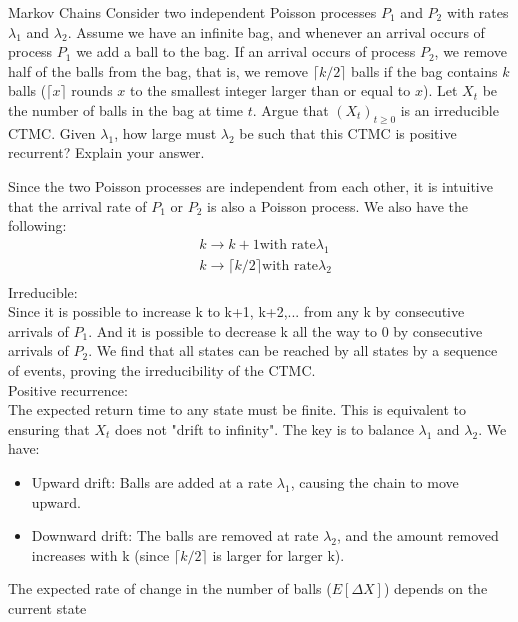 \begin{problem}{Markov Chains}
Consider two independent Poisson processes \( P_1 \) and \( P_2 \) with rates \( \lambda_1 \) and \( \lambda_2 \). Assume we have an infinite bag, and whenever an arrival occurs of process \( P_1 \) we add a ball to the bag. If an arrival occurs of process \( P_2 \), we remove half of the balls from the bag, that is, we remove \( \lceil k/2 \rceil \) balls if the bag contains \( k \) balls (\( \lceil x \rceil \) rounds \( x \) to the smallest integer larger than or equal to \( x \)). Let \( X_t \) be the number of balls in the bag at time \( t \). Argue that \( (X_t)_{t \geq 0} \) is an irreducible CTMC. Given \( \lambda_1 \), how large must \( \lambda_2 \) be such that this CTMC is positive recurrent? Explain your answer.
\end{problem}
\begin{solution}
    Since the two Poisson processes are independent from each other, it is intuitive that the arrival rate of $P_1$ or $P_2$ is also a Poisson process.  We also have the following:
    \begin{align*}
        &k \longrightarrow k+1 \text{with rate}\lambda_1\\
        &k \longrightarrow \lceil k/2 \rceil \text{with rate} \lambda_2 \\
    \end{align*}
    Irreducible:\\
    Since it is possible to increase k to k+1, k+2,... from any k by consecutive arrivals of $P_1$. And it is possible to decrease k all the way to 0 by consecutive arrivals of $P_2$. We find that all states can be reached by all states by a sequence of events, proving the irreducibility of the CTMC.
    \\
    Positive recurrence:\\
    The expected return time to any state must be finite. This is equivalent to ensuring that $X_t$ does not "drift to infinity". The key is to balance $\lambda_1$ and $\lambda_2$.
    We have:
    \begin{itemize}
        \item Upward drift: Balls are added at a rate $\lambda_1$, causing the chain to move upward.
        \item
        Downward drift: The balls are removed at rate $\lambda_2$, and the amount removed increases with k (since
        $\lceil k/2 \rceil$ is larger for larger
        k).
    \end{itemize}
    The expected rate of change in the number of balls ($E[\Delta X]$) depends on the current state

\end{solution}
